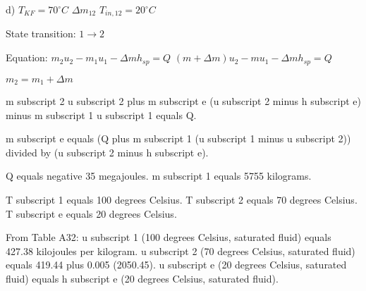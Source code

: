 d)  
\( T_{KF} = 70^\circ C \)  
\( \Delta m_{12} \)  
\( T_{in,12} = 20^\circ C \)  

State transition: \( 1 \to 2 \)  

Equation:  
\( m_2 u_2 - m_1 u_1 - \Delta m h_{sp} = Q \)  
\( (m + \Delta m) u_2 - m u_1 - \Delta m h_{sp} = Q \)  

\( m_2 = m_1 + \Delta m \)

m subscript 2 u subscript 2 plus m subscript e (u subscript 2 minus h subscript e) minus m subscript 1 u subscript 1 equals Q.  

m subscript e equals (Q plus m subscript 1 (u subscript 1 minus u subscript 2)) divided by (u subscript 2 minus h subscript e).  

Q equals negative 35 megajoules.  
m subscript 1 equals 5755 kilograms.  

T subscript 1 equals 100 degrees Celsius.  
T subscript 2 equals 70 degrees Celsius.  
T subscript e equals 20 degrees Celsius.  

From Table A32:  
u subscript 1 (100 degrees Celsius, saturated fluid) equals 427.38 kilojoules per kilogram.  
u subscript 2 (70 degrees Celsius, saturated fluid) equals 419.44 plus 0.005 (2050.45).  
u subscript e (20 degrees Celsius, saturated fluid) equals h subscript e (20 degrees Celsius, saturated fluid).